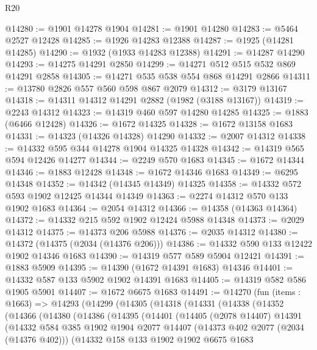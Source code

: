 \begin{lexlean}{R20}
\begin{coremodule}
@14280 := @1901 @14278 @1904
@14281 := @1901 @14280
@14283 := @5464 @2527 @12428
@14285 := @1926 @14283 @12388
@14287 := @1925 (@14281 @14285)
@14290 := @1932 (@1933 @14283 @12388)
@14291 := @14287 @14290
@14293 := @14275 @14291 @2850
@14299 := @14271 @512 @515 @532 @869 @14291 @2858
@14305 := @14271 @535 @538 @554 @868 @14291 @2866
@14311 := @13780 @2826 @557 @560 @598 @867 @2079
@14312 := @3179 @13167
@14318 := @14311 @14312 @14291 @2882 (@1982 (@3188 @13167))
@14319 := @2243 @14312
@14323 := @14319 @460 @597 @14280 @14285
@14325 := @1883 (@6466 @12428)
@14326 := @1672 @14325
@14328 := @1672 @13158 @1683
@14331 := @14323 (@14326 @14328) @14290
@14332 := @2007 @14312
@14338 := @14332 @595 @344 @14278 @1904 @14325 @14328
@14342 := @14319 @565 @594 @12426 @14277
@14344 := @2249 @570 @1683
@14345 := @1672 @14344
@14346 := @1883 @12428
@14348 := @1672 @14346 @1683
@14349 := @6295 @14348
@14352 := @14342 (@14345 @14349) @14325
@14358 := @14332 @572 @593 @1902 @12425 @14344 @14349
@14363 := @2274 @14312 @570 @133 @1902 @1683
@14364 := @2054 @14312
@14366 := @14358 (@14363 @14364)
@14372 := @14332 @215 @592 @1902 @12424 @5988 @14348
@14373 := @2029 @14312
@14375 := @14373 @206 @5988
@14376 := @2035 @14312
@14380 := @14372 (@14375 (@2034 (@14376 @206)))
@14386 := @14332 @590 @133 @12422 @1902 @14346 @1683
@14390 := @14319 @577 @589 @5904 @12421
@14391 := @1883 @5909
@14395 := @14390 (@1672 @14391 @1683) @14346
@14401 := @14332 @587 @133 @5902 @1902 @14391 @1683
@14405 := @14319 @582 @586 @1905 @5901
@14407 := @1672 @6675 @1683
@14491 := @14270
    (fun (items : @1663) =>
    @14293
      (@14299
        (@14305
          (@14318
            (@14331
              (@14338
                (@14352
                  (@14366
                    (@14380
                      (@14386
                        (@14395
                          (@14401
                            (@14405
                              (@2078 @14407)
                              @14391
                              (@14332
                                @584
                                @385
                                @1902
                                @1904
                                @2077
                                @14407
                                (@14373 @402 @2077 (@2034 (@14376 @402)))
                                (@14332
                                  @158
                                  @133
                                  @1902
                                  @1902
                                  @6675
                                  @1683

\end{coremodule}
\end{lexlean}
